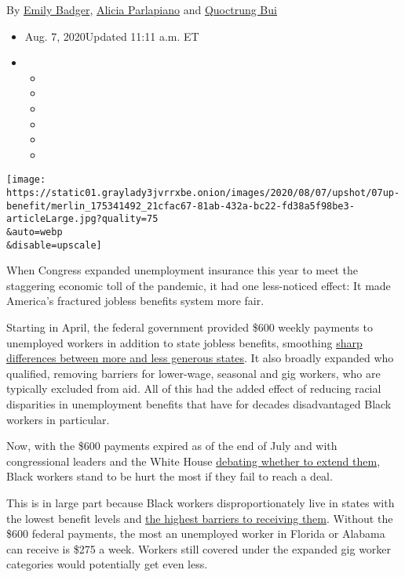 By \href{https://www.nytimes3xbfgragh.onion/by/emily-badger}{Emily
Badger},
\href{https://www.nytimes3xbfgragh.onion/by/alicia-parlapiano}{Alicia
Parlapiano} and
\href{https://www.nytimes3xbfgragh.onion/by/quoctrung-bui}{Quoctrung
Bui}

\begin{itemize}
\item
  Aug. 7, 2020Updated 11:11 a.m. ET
\item
  \begin{itemize}
  \item
  \item
  \item
  \item
  \item
  \item
  \end{itemize}
\end{itemize}

\texttt{[image: https://static01.graylady3jvrrxbe.onion/images/2020/08/07/upshot/07up-benefit/merlin\_175341492\_21cfac67-81ab-432a-bc22-fd38a5f98be3-articleLarge.jpg?quality=75\\\&auto=webp\\\&disable=upscale]}

When Congress expanded unemployment insurance this year to meet the
staggering economic toll of the pandemic, it had one less-noticed
effect: It made America's fractured jobless benefits system more fair.

Starting in April, the federal government provided \$600 weekly payments
to unemployed workers in addition to state jobless benefits, smoothing
\href{https://www.nytimes3xbfgragh.onion/interactive/2020/04/23/business/economy/unemployment-benefits-stimulus-coronavirus.html}{sharp
differences between more and less generous states}. It also broadly
expanded who qualified, removing barriers for lower-wage, seasonal and
gig workers, who are typically excluded from aid. All of this had the
added effect of reducing racial disparities in unemployment benefits
that have for decades disadvantaged Black workers in particular.

Now, with the \$600 payments expired as of the end of July and with
congressional leaders and the White House
\href{https://www.nytimes3xbfgragh.onion/2020/08/05/us/politics/mcconnell-stimulus-talks-coronavirus.html?action=click\&module=Top\%20Stories\&pgtype=Homepage}{debating
whether to extend them}, Black workers stand to be hurt the most if they
fail to reach a deal.

This is in large part because Black workers disproportionately live in
states with the lowest benefit levels and
\href{https://www.nytimes3xbfgragh.onion/2020/04/30/upshot/unemployment-state-restrictions-pandemic.html}{the
highest barriers to receiving them}. Without the \$600 federal payments,
the most an unemployed worker in Florida or Alabama can receive is \$275
a week. Workers still covered under the expanded gig worker categories
would potentially get even less.

